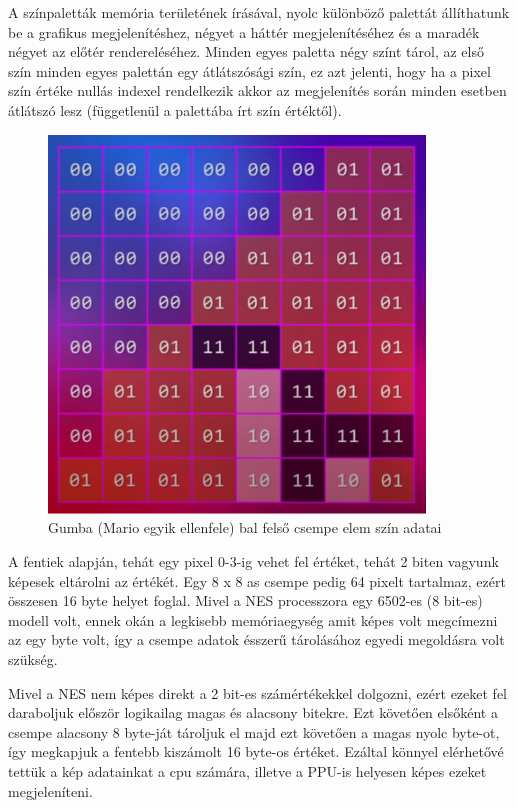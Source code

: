 	A színpaletták memória területének írásával, nyolc különböző palettát állíthatunk be a grafikus megjelenítéshez, négyet a háttér megjelenítéséhez és a maradék négyet az előtér rendereléséhez. Minden egyes paletta négy színt tárol, az első szín minden egyes palettán egy átlátszósági szín, ez azt jelenti, hogy ha a pixel szín értéke nullás indexel rendelkezik akkor az megjelenítés során minden esetben átlátszó lesz (függetlenül a palettába írt szín értéktől).
	
	\begin{figure}[H]
	\centering
	\includegraphics[width=100mm, keepaspectratio]{figures/Gumba-tile}
	\caption{Gumba (Mario egyik ellenfele) bal felső csempe elem szín adatai \cite{Neshacker_ppu}}
	\label{fig:Gumba-tile}
	\end{figure}
	
	A fentiek alapján, tehát egy pixel 0-3-ig vehet fel értéket, tehát 2 biten vagyunk képesek eltárolni az értékét. Egy 8 x 8 as csempe pedig 64 pixelt tartalmaz, ezért összesen 16 byte helyet foglal. Mivel a NES processzora egy 6502-es (8 bit-es) modell volt, ennek okán a legkisebb memóriaegység amit képes volt megcímezni az egy byte volt, így a csempe adatok ésszerű tárolásához egyedi megoldásra volt szükség.
	
	Mivel a NES nem képes direkt a 2 bit-es számértékekkel dolgozni, ezért ezeket fel daraboljuk először logikailag magas és alacsony bitekre. Ezt követően elsőként a csempe alacsony 8 byte-ját tároljuk el majd ezt követően a magas nyolc byte-ot, így megkapjuk a fentebb kiszámolt 16 byte-os értéket. Ezáltal könnyel elérhetővé tettük a kép adatainkat a cpu számára, illetve a PPU-is helyesen képes ezeket megjeleníteni.
	
